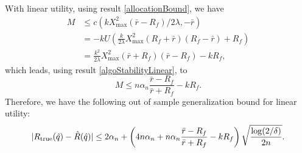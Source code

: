 With linear utility, using result \eqref{allocationBound}, we have
\begin{align*}
  M &\leq c(k X^2_{\max}(\bar r - R_f)/2\lambda, -\bar r)\\
    &=-k U\left(\frac{k}{2\lambda} X^2_{\max}(R_f+\bar r)(R_f-\bar r) + R_f\right)\\
    &=\frac{k^2}{2\lambda} X^2_{\max}(\bar r + R_f)(\bar r - R_f) - k R_f,
\end{align*}
which leads, using result \eqref{algoStabilityLinear}, to
\begin{equation*}
  M \leq n\alpha_n \frac{\bar r - R_f}{\bar r + R_f} - kR_f.
\end{equation*}
Therefore, we have the following out of sample generalization bound for linear utility:
\begin{equation*}
  |R_{\mathrm{true}}(\hat{q}) - \hat{R}(\hat{q})| \leq 
  2\alpha_n + \left(4n\alpha_n + n\alpha_n\frac{\bar r - R_f}{\bar r +
      R_f} - kR_f\right)
  \sqrt{\frac{\log(2/\delta)}{2n}}.
\end{equation*}


